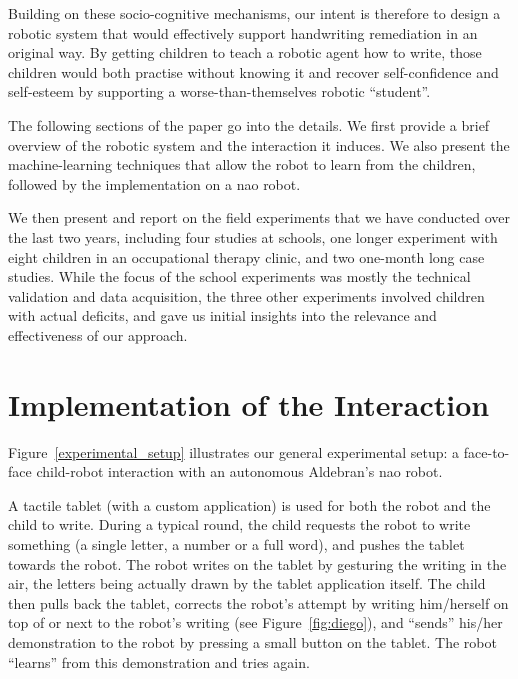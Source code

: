 \documentclass{article}
\begin{document}
Building on these socio-cognitive mechanisms, our intent is therefore to design
a robotic system that would effectively support handwriting remediation in an
original way. By getting children to teach a robotic agent how to write, those
children would both practise without knowing it and recover self-confidence and
self-esteem by supporting a worse-than-themselves robotic ``student''.

The following sections of the paper go into the details. We first provide a brief
overview of the robotic system and the interaction it induces. We also present
the machine-learning techniques that allow the robot to learn from the children,
followed by the implementation on a {\sc nao} robot.

We then present and report on the field experiments that we have conducted over
the last two years, including four studies at schools, one longer experiment with
eight children in an occupational therapy clinic, and two one-month
long case studies. While the focus of the school experiments was mostly the
technical validation and data acquisition, the three other experiments involved
children with actual deficits, and gave us initial insights into the relevance and
effectiveness of our approach.

\section{Implementation of the Interaction}

Figure~\ref{experimental_setup} illustrates our general experimental setup: a
face-to-face child-robot interaction with an autonomous Aldebran's {\sc nao}
robot.

A tactile tablet (with a custom application) is used for both the robot and the
child to write. During a typical round, the child requests the robot to write
something (a single letter, a number or a full word), and pushes the tablet
towards the robot. The robot writes on the tablet by gesturing the writing in
the air,  the letters being actually drawn by the tablet application itself. The
child then pulls back the tablet, corrects the robot's attempt by writing
him/herself on top of or next to the robot's writing (see Figure~\ref{fig:diego}),
and ``sends'' his/her demonstration to the robot by pressing a small button on
the tablet. The robot ``learns'' from this demonstration and tries again.
\end{document}
